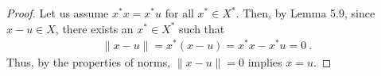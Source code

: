 \begin{questions}


\begin{solution}
  \begin{proof}
  Let us assume $x^{\ast} x = x^{\ast} u$ for all $x^{\ast} \in X^{\ast}$. Then, by Lemma 5.9, since $x-u \in X$, there exists an $x^{\ast} \in X^{\ast}$ such that
\begin{align*}
\|x - u\| = x^{\ast}(x - u) = x^{\ast}x - x^{\ast}u = 0~.
\end{align*}
Thus, by the properties of norms, $\|x - u\| = 0$ implies $x = u$.

\end{proof}
\end{solution}
\end{questions}